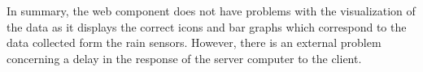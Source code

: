 In summary, the web component does not have problems with the visualization of the data as it displays the correct icons and bar graphs which correspond to the data collected form the rain sensors. However, there is an external problem concerning a delay in the response of the server computer to the client.